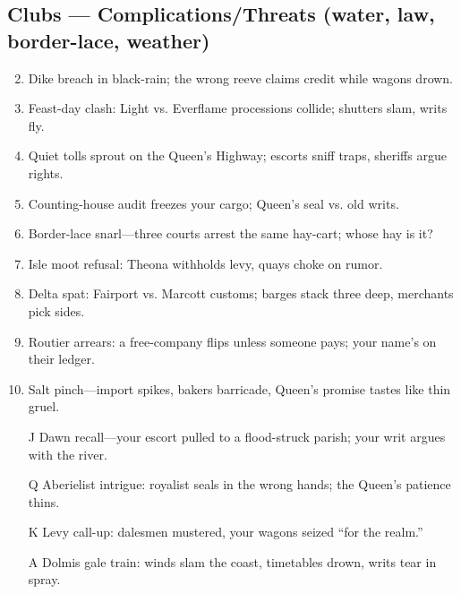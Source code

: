 \subsection*{Clubs --- Complications/Threats (water, law, border-lace, weather)}
\label{sec:viterra-complications}
\begin{enumerate}
\setcounter{enumi}{1}
\item Dike breach in black-rain; the wrong reeve claims credit while wagons drown.
\item Feast-day clash: Light vs. Everflame processions collide; shutters slam, writs fly.
\item Quiet tolls sprout on the Queen’s Highway; escorts sniff traps, sheriffs argue rights.
\item Counting-house audit freezes your cargo; Queen’s seal vs. old writs.
\item Border-lace snarl—three courts arrest the same hay-cart; whose hay is it?
\item Isle moot refusal: Theona withholds levy, quays choke on rumor.
\item Delta spat: Fairport vs. Marcott customs; barges stack three deep, merchants pick sides.
\item Routier arrears: a free-company flips unless someone pays; your name’s on their ledger.
\item Salt pinch—import spikes, bakers barricade, Queen’s promise tastes like thin gruel.
\item[J] Dawn recall—your escort pulled to a flood-struck parish; your writ argues with the river.
\item[Q] Aberielist intrigue: royalist seals in the wrong hands; the Queen’s patience thins.
\item[K] Levy call-up: dalesmen mustered, your wagons seized “for the realm.”
\item[A] Dolmis gale train: winds slam the coast, timetables drown, writs tear in spray.
\end{enumerate}

